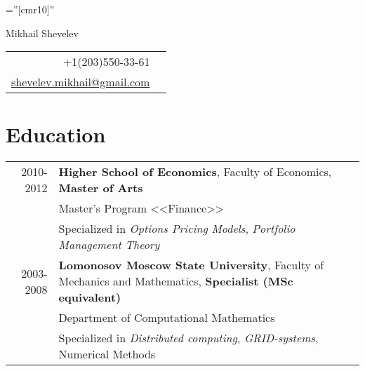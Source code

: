 \documentclass[unicode,a4paper,10pt]{article}
\begin{document}
\pagestyle{empty} %

\font\fb=''[cmr10]'' %

\par{
\begin{flushright}
{\Large Mikhail Shevelev}\\
\medskip	%
{\normalsize
\begin{tabular}{rr}
    +1(203)550-33-61\\
    \href{mailto:shevelev.mikhail@gmail.com}{shevelev.mikhail@gmail.com}
\end{tabular}
}
\end{flushright}
\par}



\section{Education}
\begin{tabular}{rl}
2010-2012& \textbf{Higher School of Economics}, Faculty of Economics, \textbf{Master of Arts}\\
& Master's Program <<Finance>>\\%
& Specialized in \textit{Options Pricing Models}, \textit{Portfolio Management Theory} \\
2003-2008& \textbf{Lomonosov Moscow State University}, Faculty of Mechanics and Mathematics, \textbf{Specialist (MSc equivalent)}\\
& Department of Computational Mathematics \\
& Specialized in \textit{Distributed computing}, \textit{GRID-systems}, Numerical Methods \\
\end{tabular}
\end{document}
